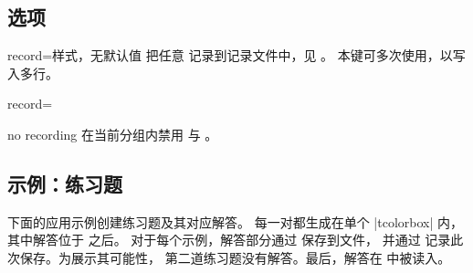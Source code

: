 \subsection{选项}\label{sec:recording-options}
\begin{docTcbKey}[][doc new=2014-11-28]{record}{=}{样式，无默认值}
  把任意 记录到记录文件中，见 。
  本键可多次使用，以写入多行。
  \begin{dispListing}
  record={\string{}}
  \end{dispListing}
\end{docTcbKey}

\begin{docTcbKey}[][doc new=2014-11-28]{no recording}{}{}
  在当前分组内禁用  与 。
\end{docTcbKey}


\clearpage
\subsection{示例：练习题}\label{sec:recording-exercises}
下面的应用示例创建练习题及其对应解答。
每一对都生成在单个 |tcolorbox| 内，其中解答位于  之后。
对于每个示例，解答部分通过  保存到文件，
并通过  记录此次保存。为展示其可能性，
第二道练习题没有解答。最后，解答在  中被读入。


